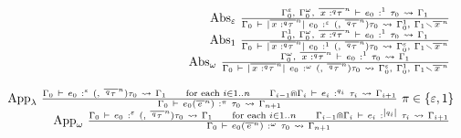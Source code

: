 \[\begin{array}{r}
{\text{Abs}_{\varepsilon}\ \frac{\text{\quad\quad}{\Gamma_{0}^{\varepsilon}{,\ }\Gamma_{0}^{\omega}{,\ }{\overline{\,{x\text{ :}^{q}\tau}\:}}^{n}\  \vdash \ e_{0}\ :^{1}\ \tau_{0}\  \rightsquigarrow \ \Gamma_{1}}}{\Gamma_{0}\  \vdash \ {|{\overline{\,{x\text{ :}^{q}\tau}\:}}^{n}|\ e_{0}}\ :^{\varepsilon}\ {({,\ }{\overline{\,{{}^{q}\tau}\:}}^{n})\tau_{0}}\  \rightsquigarrow \ \Gamma_{0}^{1}{,\ }\Gamma_{1} \smallsetminus {\overline{\, x\:}}^{n}}\ } \\
{\text{Abs}_{1}\ \frac{\text{\quad\quad}{\Gamma_{0}^{1}{,\ }\Gamma_{0}^{\omega}{,\ }{\overline{\,{x\text{ :}^{q}\tau}\:}}^{n}\  \vdash \ e_{0}\ :^{1}\ \tau_{0}\  \rightsquigarrow \ \Gamma_{1}}}{\Gamma_{0}\  \vdash \ {|{\overline{\,{x\text{ :}^{q}\tau}\:}}^{n}|\ e_{0}}\ :^{1}\ {({,\ }{\overline{\,{{}^{q}\tau}\:}}^{n})\tau_{0}}\  \rightsquigarrow \ \Gamma_{0}^{\varepsilon}{,\ }\Gamma_{1} \smallsetminus {\overline{\, x\:}}^{n}}\ } \\
{\text{Abs}_{\omega}\ \frac{\text{\quad\quad}{\Gamma_{0}^{\omega}{,\ }{\overline{\,{x\text{ :}^{q}\tau}\:}}^{n}\  \vdash \ e_{0}\ :^{1}\ \tau_{0}\  \rightsquigarrow \ \Gamma_{1}}}{\Gamma_{0}\  \vdash \ {|{\overline{\,{x\text{ :}^{q}\tau}\:}}^{n}|\ e_{0}}\ :^{\omega}\ {({,\ }{\overline{\,{{}^{q}\tau}\:}}^{n})\tau_{0}}\  \rightsquigarrow \ \Gamma_{0}^{\varepsilon}{,\ }\Gamma_{0}^{1}{,\ }\Gamma_{1} \smallsetminus {\overline{\, x\:}}^{n}}\ } \\
 \\
{\text{App}_{\lambda}\ \frac{{\Gamma_{0}\  \vdash \ e_{0}\ :^{\varepsilon}\ {({,\ }{\overline{\,{{}^{q}\tau}\:}}^{n})\tau_{0}}\  \rightsquigarrow \ \Gamma_{1}}\text{\quad\quad}{\text{for each }i \in 1..n}\text{\quad\quad}{\Gamma_{i - 1} \Cap \Gamma_{i}\  \vdash \ e_{i}\ :^{q_{i}}\ \tau_{i}\  \rightsquigarrow \ \Gamma_{i + 1}}}{\Gamma_{0}\  \vdash \ {e_{0}({\overline{\, e\:}}^{n})}\ :^{\pi}\ \tau_{0}\  \rightsquigarrow \ \Gamma_{n + 1}}\ \pi \in \left\{ \varepsilon,1 \right\}} \\
{\text{App}_{\omega}\ \frac{{\Gamma_{0}\  \vdash \ e_{0}\ :^{\varepsilon}\ {({,\ }{\overline{\,{{}^{q}\tau}\:}}^{n})\tau_{0}}\  \rightsquigarrow \ \Gamma_{1}}\text{\quad\quad}{\text{for each }i \in 1..n}\text{\quad\quad}{\Gamma_{i - 1} \Cap \Gamma_{i}\  \vdash \ e_{i}\ :^{\left| q_{i} \right|}\ \tau_{i}\  \rightsquigarrow \ \Gamma_{i + 1}}}{\Gamma_{0}\  \vdash \ {e_{0}({\overline{\, e\:}}^{n})}\ :^{\omega}\ \tau_{0}\  \rightsquigarrow \ \Gamma_{n + 1}}\ } \\
 \\

\end{array}\]
